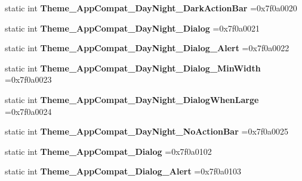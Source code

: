 \begin{DoxyCompactItemize}
\item 
\mbox{\label{classandroid_1_1support_1_1v4_1_1R_1_1style_a2927093bb6f33c7536d396a9b0e6bfb0}} 
static int {\bfseries Theme\+\_\+\+App\+Compat\+\_\+\+Day\+Night\+\_\+\+Dark\+Action\+Bar} =0x7f0a0020
\item 
\mbox{\label{classandroid_1_1support_1_1v4_1_1R_1_1style_a69fb97bc769b78984baa148776f5b839}} 
static int {\bfseries Theme\+\_\+\+App\+Compat\+\_\+\+Day\+Night\+\_\+\+Dialog} =0x7f0a0021
\item 
\mbox{\label{classandroid_1_1support_1_1v4_1_1R_1_1style_ac28c88f71f683f3afe45cbf2730ec3d0}} 
static int {\bfseries Theme\+\_\+\+App\+Compat\+\_\+\+Day\+Night\+\_\+\+Dialog\+\_\+\+Alert} =0x7f0a0022
\item 
\mbox{\label{classandroid_1_1support_1_1v4_1_1R_1_1style_ab0a307dbf4aeacaa44e44b8e6b025b42}} 
static int {\bfseries Theme\+\_\+\+App\+Compat\+\_\+\+Day\+Night\+\_\+\+Dialog\+\_\+\+Min\+Width} =0x7f0a0023
\item 
\mbox{\label{classandroid_1_1support_1_1v4_1_1R_1_1style_a17ff0a35152f7eb225b2d5ac89e39f18}} 
static int {\bfseries Theme\+\_\+\+App\+Compat\+\_\+\+Day\+Night\+\_\+\+Dialog\+When\+Large} =0x7f0a0024
\item 
\mbox{\label{classandroid_1_1support_1_1v4_1_1R_1_1style_aba95e5296312afaf551046707344ff3c}} 
static int {\bfseries Theme\+\_\+\+App\+Compat\+\_\+\+Day\+Night\+\_\+\+No\+Action\+Bar} =0x7f0a0025
\item 
\mbox{\label{classandroid_1_1support_1_1v4_1_1R_1_1style_abe1c1fa10c3f8c7ac3114890a5aea4e4}} 
static int {\bfseries Theme\+\_\+\+App\+Compat\+\_\+\+Dialog} =0x7f0a0102
\item 
\mbox{\label{classandroid_1_1support_1_1v4_1_1R_1_1style_aa7fecaa99ea9bf0748de7fe67739298c}} 
static int {\bfseries Theme\+\_\+\+App\+Compat\+\_\+\+Dialog\+\_\+\+Alert} =0x7f0a0103

\end{DoxyCompactItemize}
